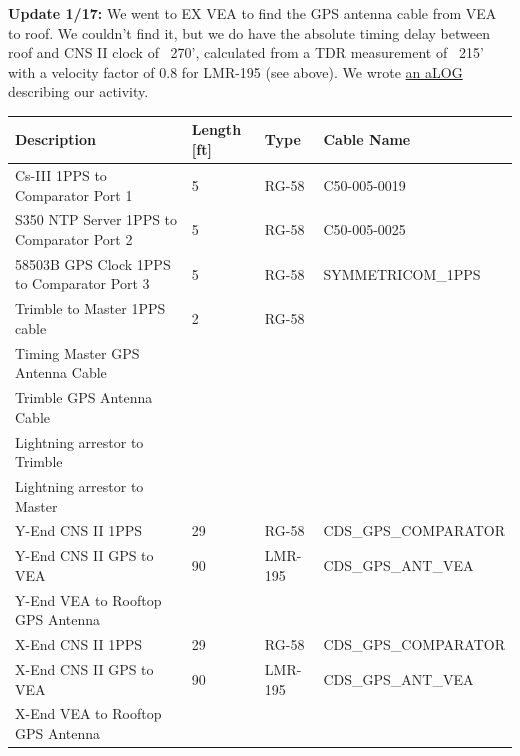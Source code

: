 \documentclass{article}
\begin{document}
\textbf{Update 1/17:} We went to EX VEA to find the GPS antenna cable from VEA to roof. We couldn't find it, but we do have the absolute timing delay between roof and CNS II clock of ~270', calculated from a TDR measurement of ~215' with a velocity factor of 0.8 for LMR-195 (see above). We wrote \href{https://alog.ligo-wa.caltech.edu/aLOG/index.php?callRep=46499}{an aLOG} describing our activity.

\begin{center}
  \label{table:lho-cables}
  \begin{tabular}{ | l | l | l | l | }
    \hline
    \textbf{Description}  			            & \textbf{Length [ft]} 	& \textbf{Type} & \textbf{Cable Name} \\ \hline
    Cs-III 1PPS to Comparator Port 1            & 5 					& RG-58			& C50-005-0019 \\ \hline
    S350 NTP Server 1PPS to Comparator Port 2   & 5 					& RG-58			& C50-005-0025 \\ \hline
    58503B GPS Clock 1PPS to Comparator Port 3  & 5 					& RG-58			& SYMMETRICOM\_1PPS \\ \hline
    Trimble to Master 1PPS cable	            & 2 					& RG-58			& \\ \hline
    Timing Master GPS Antenna Cable	            &  						& 				& \\ \hline
    Trimble GPS Antenna Cable                   &  						& 				& \\ \hline
    Lightning arrestor to Trimble               &  						& 				& \\ \hline
    Lightning arrestor to Master                &  						& 				& \\ \hline
    Y-End CNS II 1PPS  				            & 29 					& RG-58 		& CDS\_GPS\_COMPARATOR \\ \hline
    Y-End CNS II GPS to VEA                     & 90					& LMR-195		& CDS\_GPS\_ANT\_VEA \\ \hline
    Y-End VEA to Rooftop GPS Antenna            &                       &               & \\ \hline
    X-End CNS II 1PPS				            & 29					& RG-58			& CDS\_GPS\_COMPARATOR \\ \hline
    X-End CNS II GPS to VEA                     & 90					& LMR-195		& CDS\_GPS\_ANT\_VEA \\ \hline
    X-End VEA to Rooftop GPS Antenna            &                       &               & \\
    \hline
  \end{tabular}
\end{center}
\end{document}
